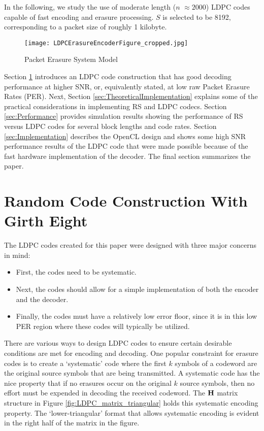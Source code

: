 \documentclass[conference]{IEEEtran}
\begin{document}
In the following, we study the use of moderate length ($n$ $\approx 2000$) LDPC codes capable of fast encoding and erasure processing.  $S$ is selected to be 8192, corresponding to a packet size of roughly 1 kilobyte.

\begin{figure}[htbp]
	\centerline{\texttt{[image: LDPCErasureEncoderFigure\_cropped.jpg]}}
	\caption{Packet Erasure System Model}
	\label{fig:LDPC_erasure_model}
\end{figure}


Section \ref{sec:LDPC_construction} introduces an LDPC code construction that has good decoding performance at higher SNR, or, equivalently stated, at low raw Packet Erasure Rates (PER).  Next, Section \ref{sec:TheoreticalImplementation} explains some of the practical considerations in implementing RS and LDPC codecs.  Section \ref{sec:Performance} provides simulation results showing the performance of RS versus LDPC codes for several block lengths and code rates.  Section \ref{sec:Implementation} describes the OpenCL design and shows some high SNR performance results of the LDPC code that were made possible because of the fast hardware implementation of the decoder.  The final section summarizes the paper.

\section{Random Code Construction With Girth Eight}\label{sec:LDPC_construction}


The LDPC codes created for this paper were designed with three major concerns in mind:

\begin{itemize}
	\item First, the codes need to be systematic.
	\item Next, the codes should allow for a simple implementation of both the encoder and the decoder.
	\item Finally, the codes must have a relatively low error floor, since it is in this low PER region where these codes will typically be utilized.
\end{itemize}

There are various ways to design LDPC codes to ensure certain desirable conditions are met for encoding and decoding.  One popular constraint for erasure codes is to create a ‘systematic’ code where the first $k$ symbols of a codeword are the original source symbols that are being transmitted.  A systematic code has the nice property that if no erasures occur on the original $k$ source symbols, then no effort must be expended in decoding the received codeword.  The $\bf{H}$ matrix structure in Figure \ref{fig:LDPC_matrix_triangular} holds this systematic encoding property.  The ‘lower-triangular’ format that allows systematic encoding is evident in the right half of the matrix in the figure.  
\end{document}
